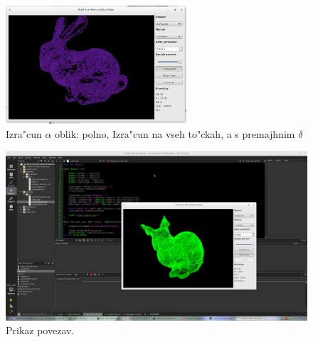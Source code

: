\documentclass[11pt]{article}
\begin{document}
\begin{figure}[htb]
    \centering
    \includegraphics[width=0.6\textwidth]{alpha_lowdelta.png}
    \caption{Izra"cun $\alpha$ oblik: polno, Izra"cun na vseh to"ckah, a s premajhnim $\delta$}
    \label{fig:a1}
\end{figure}

\begin{figure}[htb]
    \centering
    \includegraphics[width=\textwidth]{lines.png}
    \caption{Prikaz povezav.}
    \label{fig:edges}
\end{figure}
\end{document}
